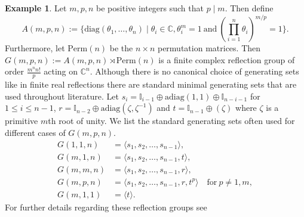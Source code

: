\documentclass[12pt]{amsart}
\theoremstyle{plain}
\theoremstyle{definition}
\numberwithin{equation}{section}
\newtheorem{example}[theorem]{Example}
\numberwithin{equation}{section}
\begin{document}
	\begin{example}\label{gmpn}
		Let $m,p,n$ be positive integers such that $p\mid m$. Then define \[A(m,p,n):=\{\text{diag}(\theta_1,\dots,\theta_n)\mid \theta_i\in \mathbb{C}, \theta_i^m=1 \ \text{and} \ (\prod_{i=1}^{n}\theta_i)^{m/p}=1 \}.\] Furthermore, let $\text{Perm}(n)$ be the $n\times n$ permutation matrices. Then $G(m,p,n):=A(m,p,n)\rtimes \text{Perm}(n)$ is a finite complex reflection group of order $\frac{m^n n!}{p}$ acting on $\mathbb{C}^n$. Although there is no canonical choice of generating sets like in finite real reflections there are standard minimal generating sets that are used throughout literature. Let $s_i=\mathbb{I}_{i-1}\oplus\text{adiag}(1,1)\oplus\mathbb{I}_{n-i-1}$ for $1\leq i \leq n-1$, $r=\mathbb{I}_{n-2}\oplus \text{adiag}(\zeta,\zeta^{-1})$ and $t=\mathbb{I}_{n-1}\oplus(\zeta)$ where $\zeta$ is a primitive $m$th root of unity. We list the standard generating sets often used for different cases of $G(m,p,n)$. \begin{align*}
			G(1,1,n)&=\langle s_1,s_2,\dots, s_{n-1} \rangle, \\
			G(m,1,n)&=\langle s_1,s_2,\dots,s_{n-1}, t\rangle, \\
			G(m,m,n)&=\langle s_1,s_2,\dots,s_{n-1},r\rangle, \\
			G(m,p,n)&=\langle s_1,s_2,\dots,s_{n-1}, r, t^p\rangle \hspace{1em} \text{for} \ p\neq 1,m, \\
			G(m,1,1)&=\langle t\rangle.
		\end{align*}
		For further details regarding these reflection groups see \cite[Chap. 2]{GUSTAY}
	\end{example}
	
\end{document}
